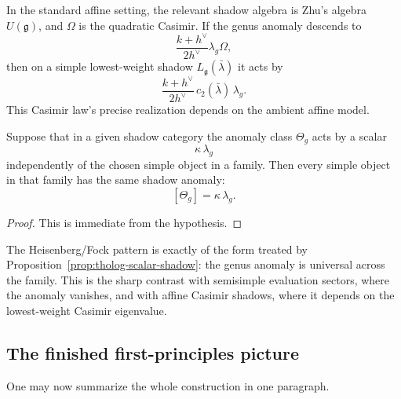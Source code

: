 \begin{remark}
In the standard affine setting, the relevant shadow algebra is Zhu's algebra \(U(\mathfrak{g})\), and \(\Omega\) is the quadratic Casimir.
If the genus anomaly descends to
\[
\frac{k+h^{\vee}}{2h^{\vee}}\lambda_{g}\Omega,
\]
then on a simple lowest-weight shadow \(L_{\mathfrak{g}}(\bar\lambda)\) it acts by
\[
\frac{k+h^{\vee}}{2h^{\vee}}\,c_{2}(\bar\lambda)\,\lambda_{g}.
\]
This Casimir law's precise realization depends on the ambient affine model.
\end{remark}

\begin{proposition}
Suppose that in a given shadow category the anomaly class \(\Theta_{g}\) acts by a scalar
\[
\kappa\,\lambda_{g}
\]
independently of the chosen simple object in a family.
Then every simple object in that family has the same shadow anomaly:
\[
[\Theta_{g}]=\kappa\,\lambda_{g}.
\]
\end{proposition}

\begin{proof}
This is immediate from the hypothesis.
\end{proof}

\begin{remark}
The Heisenberg/Fock pattern is exactly of the form treated by Proposition~\ref{prop:tholog-scalar-shadow}: the genus anomaly is universal across the family.
This is the sharp contrast with semisimple evaluation sectors, where the anomaly vanishes, and with affine Casimir shadows, where it depends on the lowest-weight Casimir eigenvalue.
\end{remark}

\subsection{The finished first-principles picture}

One may now summarize the whole construction in one paragraph.

